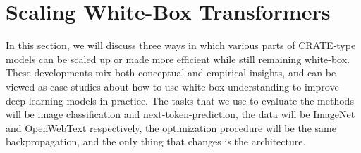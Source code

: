 \documentclass[\toplevelprefix/book-main.tex]{subfiles}
\begin{document}







\section{Scaling White-Box Transformers}\label{sec:scalable}

In this section, we will discuss three ways in which various parts of CRATE-type models can be scaled up or made more efficient while still remaining white-box. These developments mix both conceptual and empirical insights, and can be viewed as case studies about how to use white-box understanding to improve deep learning models in practice. The tasks that we use to evaluate the methods will be image classification and next-token-prediction, the data will be ImageNet and OpenWebText respectively, the optimization procedure will be the same backpropagation, and the only thing that changes is the architecture.
\end{document}
